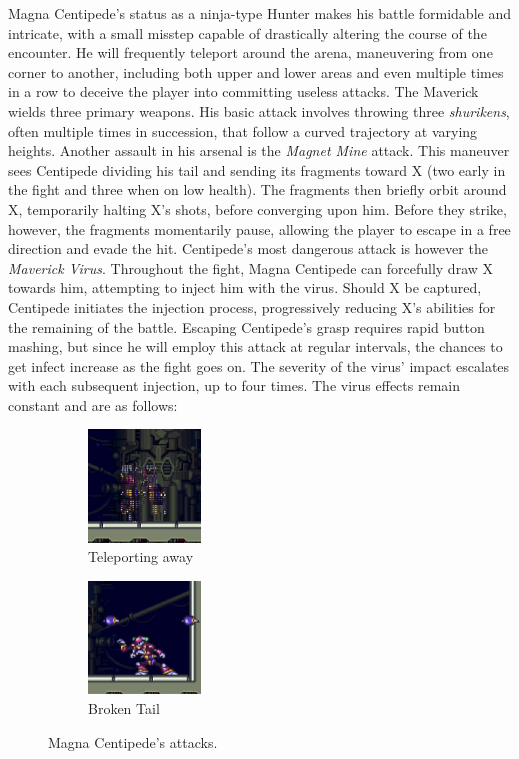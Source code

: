 Magna Centipede's status as a ninja-type Hunter makes his battle formidable and intricate, with a small misstep capable of drastically altering the course of the encounter. He will frequently teleport around the arena, maneuvering from one corner to another, including both upper and lower areas and even multiple times in a row to deceive the player into committing useless attacks. The Maverick wields three primary weapons. His basic attack involves throwing three \emph{shurikens}, often multiple times in succession, that 
follow a curved trajectory at varying heights. Another assault in his arsenal is the \emph{Magnet Mine} attack. This maneuver sees Centipede dividing his tail and sending its fragments toward X (two early in the fight and three when on low health). The fragments then briefly orbit around X, temporarily halting X's shots, before converging upon him. Before they strike, however, the fragments momentarily pause, allowing the player to escape in a free direction and evade the hit. Centipede's most dangerous attack is however the \emph{Maverick Virus}. Throughout the fight, Magna Centipede can forcefully draw X towards him, attempting to inject him with the virus. Should X be captured, Centipede initiates the injection process, progressively reducing X's abilities for the remaining of the battle. Escaping Centipede's grasp requires rapid button mashing, but since he will employ this attack at regular intervals, the chances to get infect increase as the fight goes on. The severity of the virus' impact escalates with each subsequent injection, up to four times. The virus effects remain constant and are as follows:
\begin{figure}[htp]
	\ContinuedFloat
	\centering
	\begin{subfigure}{0.3\linewidth}
		\centering
		\includegraphics[height=3cm]{figures/X2/Magna_centipede/Centipede_teleport.png}
		\caption{Teleporting away}
	\end{subfigure}
	\begin{subfigure}{0.3\linewidth}
		\centering
		\includegraphics[height=3cm]{figures/X2/Magna_centipede/Centipede_no_tail.png}
		\caption{Broken Tail}
	\end{subfigure}
	\caption{Magna Centipede's attacks.}	
\end{figure}
